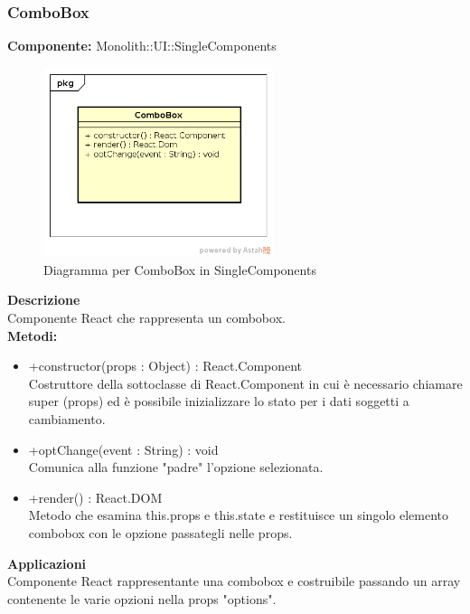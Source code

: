 \clearpage

\subsubsection{ComboBox}
\textbf{Componente:}  Monolith::UI::SingleComponents\\
   \FloatBarrier
   \begin{figure}[ht]
   \centering
   \includegraphics[width=0.6\textwidth]{img/single-ComboBox.png}
   \caption{{Diagramma per ComboBox in SingleComponents}}
\end{figure}
\FloatBarrier
\textbf{Descrizione}\\
Componente React che rappresenta un combobox. \\
\textbf{Metodi:} 
\begin{itemize}
\item +constructor(props : Object) : React.Component 
\\
Costruttore della sottoclasse di React.Component in cui è necessario chiamare super (props) ed è possibile inizializzare lo stato per i dati soggetti a cambiamento.

\item +optChange(event : String) : void  
\\
Comunica alla funzione "padre" l'opzione selezionata.

\item +render() : React.DOM 
\\
Metodo che esamina this.props e this.state e restituisce un singolo elemento combobox con le opzione passategli nelle props.

\end{itemize} 


\textbf{Applicazioni}\\
Componente React rappresentante una combobox e costruibile passando un array contenente le varie opzioni nella props "options". 


